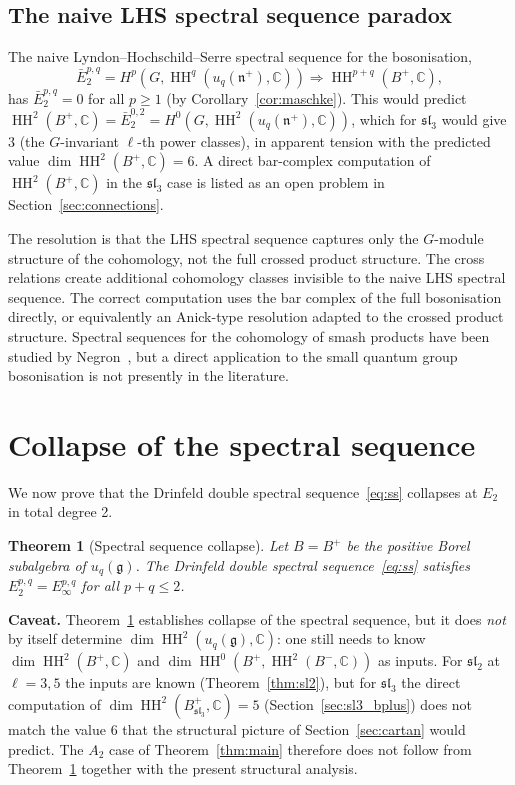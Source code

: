 \documentclass[11pt,letterpaper]{amsart}
\theoremstyle{plain}
\newtheorem{theorem}{Theorem}[section]
\theoremstyle{definition}
\theoremstyle{remark}
\newcommand{\HH}{\operatorname{HH}}
\newcommand{\CC}{\mathbb{C}}
\newcommand{\bplus}{B^{+}}
\begin{document}
\subsection{The naive LHS spectral sequence paradox}
\label{sec:lhsparadox}

The naive Lyndon--Hochschild--Serre spectral sequence for the bosonisation,
\[
\bar{E}_2^{p,q} = H^p(G, \HH^q(u_q(\mathfrak{n}^+), \CC)) \Longrightarrow \HH^{p+q}(\bplus, \CC),
\]
has $\bar{E}_2^{p,q} = 0$ for all $p \geq 1$ (by Corollary~\ref{cor:maschke}). This would predict $\HH^2(\bplus, \CC) = \bar{E}_2^{0,2} = H^0(G, \HH^2(u_q(\mathfrak{n}^+), \CC))$, which for $\mathfrak{sl}_3$ would give $3$ (the $G$-invariant $\ell$-th power classes), in apparent tension with the predicted value $\dim \HH^2(\bplus, \CC) = 6$. A direct bar-complex computation of $\HH^2(\bplus, \CC)$ in the $\mathfrak{sl}_3$ case is listed as an open problem in Section~\ref{sec:connections}.

The resolution is that the LHS spectral sequence captures only the $G$-module structure of the cohomology, not the full crossed product structure. The cross relations create additional cohomology classes invisible to the naive LHS spectral sequence. The correct computation uses the bar complex of the full bosonisation directly, or equivalently an Anick-type resolution adapted to the crossed product structure. Spectral sequences for the cohomology of smash products have been studied by Negron~\cite{Neg15}, but a direct application to the small quantum group bosonisation is not presently in the literature.

\section{Collapse of the spectral sequence}
\label{sec:spectral}
We now prove that the Drinfeld double spectral sequence~\eqref{eq:ss} collapses at $E_2$ in total degree 2.

\begin{theorem}[Spectral sequence collapse]
\label{thm:collapse}
Let $B = \bplus$ be the positive Borel subalgebra of $u_q(\mathfrak{g})$. The Drinfeld double spectral sequence~\eqref{eq:ss} satisfies $E_2^{p,q} = E_\infty^{p,q}$ for all $p + q \leq 2$.
\end{theorem}

\noindent\textbf{Caveat.} Theorem~\ref{thm:collapse} establishes collapse of the spectral sequence, but it does \emph{not} by itself determine $\dim \HH^2(u_q(\mathfrak{g}), \CC)$: one still needs to know $\dim \HH^2(B^+, \CC)$ and $\dim \HH^0(B^+, \HH^2(B^-, \CC))$ as inputs. For $\mathfrak{sl}_2$ at $\ell = 3, 5$ the inputs are known (Theorem~\ref{thm:sl2}), but for $\mathfrak{sl}_3$ the direct computation of $\dim \HH^2(B^+_{\mathfrak{sl}_3}, \CC) = 5$ (Section~\ref{sec:sl3_bplus}) does not match the value $6$ that the structural picture of Section~\ref{sec:cartan} would predict. The $A_2$ case of Theorem~\ref{thm:main} therefore does not follow from Theorem~\ref{thm:collapse} together with the present structural analysis.
\end{document}
